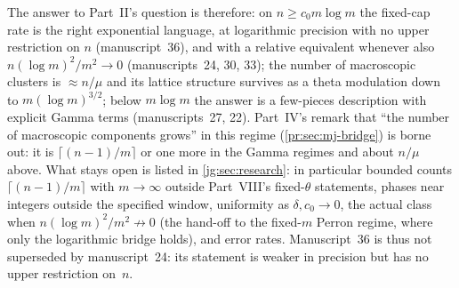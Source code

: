 \documentclass[11pt,a4paper]{article}
\theoremstyle{definition}\newaliascnt{definition}{theorem}
\theoremstyle{remark}\newaliascnt{remark}{theorem}
\begin{document}
The answer to Part~II's question is therefore: on $n\ge c_0m\log m$ the
fixed-cap rate is the right exponential language, at logarithmic precision
with no upper restriction on $n$ (manuscript~36), and with a relative
equivalent whenever also $n(\log m)^2/m^2\to0$ (manuscripts~24, 30, 33); the
number of macroscopic clusters is $\approx n/\mu$ and its lattice structure
survives as a theta modulation down to $m(\log m)^{3/2}$; below $m\log m$ the
answer is a few-pieces description with explicit Gamma terms
(manuscripts~27, 22). Part~IV's remark that ``the number of macroscopic
components grows'' in this regime (\cref{pr:sec:mj-bridge}) is borne out: it
is $\lceil(n-1)/m\rceil$ or one more in the Gamma regimes and about $n/\mu$
above. What stays open is listed in \cref{jg:sec:research}: in particular
bounded counts $\lceil(n-1)/m\rceil$ with $m\to\infty$ outside Part~VIII's
fixed-$\theta$ statements, phases near integers outside the specified window,
uniformity as $\delta,c_0\to0$, the actual class when $n(\log m)^2/m^2\not\to0$
(the hand-off to the fixed-$m$ Perron regime, where only the logarithmic
bridge holds), and error rates. Manuscript~36 is thus not superseded by
manuscript~24: its statement is weaker in precision but has no upper
restriction on~$n$.
\end{document}
